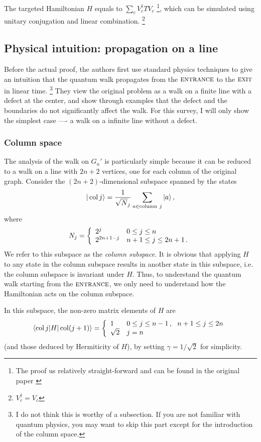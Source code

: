 \documentclass[aps,11pt,twoside,nofootinbib,tightenlines,superscriptaddress,preprintnumbers]{revtex4}
\makeatletter
\newcommand{\<}{\langle}
\renewcommand{\>}{\rangle}
\newcommand{\be}{\begin{equation}}
\newcommand{\ee}{\end{equation}}
\newcommand{\cond}[1]{\left\{\begin{array}{l@{~~~}l}#1\end{array}\right.}
\newcommand{\ent}{{\textsc{entrance}}}
\newcommand{\exit}{{\textsc{exit}}}
\newcommand{\col}{\mathop{\mathrm{col}}\nolimits}
\newenvironment{proof sketch}
{\trivlist\item\noindent{\bf Proof sketch}~}
{\qed\endtrivlist}
\makeatother
\begin{document}
The targeted Hamiltonian $H$ equals to $\sum_c V_c^\dag T V_c$ \footnote{The proof us relatively straight-forward and can be found in the original paper \cite{EXP03}}, which can be simulated using unitary conjugation and linear combination. \footnote{$V_c^\dag = V_c$}

\subsection{Physical intuition: propagation on a line}\label{subsec:line}

Before the actual proof, the authors first use standard physics techniques to give an intuition that the quantum walk propagates from the $\ent$ to the $\exit$ in linear time. \footnote{I do not think this is worthy of a subsection. If you are not familiar with quantum physics, you may want to skip this part except for the introduction of the column space.} They view the original problem as a walk on a finite line with a defect at the center, and show through examples that the defect and the boundaries do not significantly affect the walk. For this survey, I will only show the simplest case ---- a walk on a infinite line without a defect.

\subsubsection{Column space}

The analysis of the walk on $G_n'$ is particularly simple because it can
be reduced to a walk on a line with $2n+2$ vertices, one for each column
of the original graph.  Consider the $(2n+2)$-dimensional subspace spanned
by the states
\be
  |\col j\> = {1 \over \sqrt N_j} \sum_{a \in \mathrm{column~} j} |a\>
\,,
\ee
where
\be
  N_j = \cond{2^j        &   0 \le j \le n \\
              2^{2n+1-j} & n+1 \le j \le 2n+1 \,.}
\ee
We refer to this subspace as the {\em column subspace}. It is obvious that applying $H$ to any state in the column subspace results in another state in this subspace, i.e. the column subspace is
invariant under $H$. Thus, to understand the quantum walk starting from the $\ent$, we only need to understand how the Hamiltonian acts on the column subspace.

In this subspace, the non-zero matrix elements of $H$ are
\be
  \<\col j|H|\col(j+1)\> = \cond{
   1 & 0 \le j \le n-1 \,,~~ n+1 \le j \le 2n \\
  \sqrt 2       & j=n}
\label{eq:lineham}
\ee 
(and those deduced by Hermiticity of $H$), by setting $\gamma=1/\sqrt2$ for simplicity.
\end{document}
